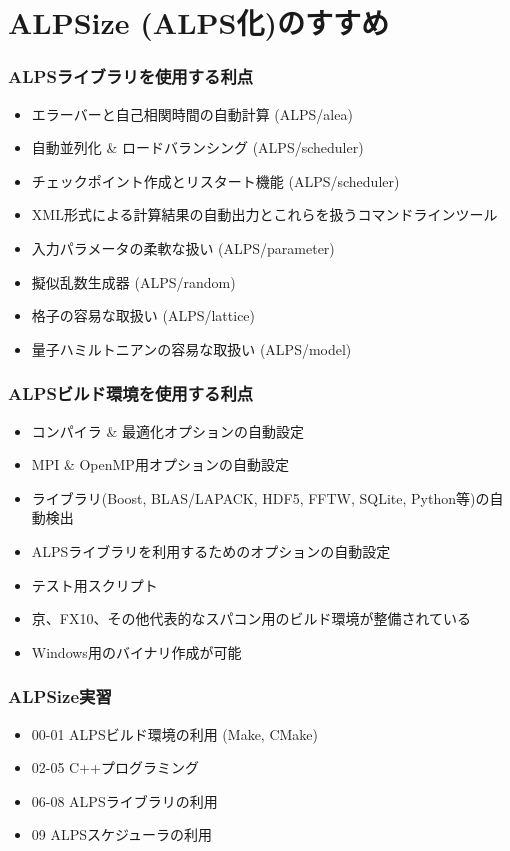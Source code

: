 \section{ALPSize (ALPS化)のすすめ}
\begin{frame}
  \frametitle{ALPSライブラリを使用する利点}
  \begin{itemize}
  \item エラーバーと自己相関時間の自動計算 (ALPS/alea)
  \item 自動並列化 \& ロードバランシング (ALPS/scheduler)
  \item チェックポイント作成とリスタート機能 (ALPS/scheduler)
  \item XML形式による計算結果の自動出力とこれらを扱うコマンドラインツール
  \item 入力パラメータの柔軟な扱い (ALPS/parameter)
  \item 擬似乱数生成器 (ALPS/random)
  \item 格子の容易な取扱い (ALPS/lattice)
  \item 量子ハミルトニアンの容易な取扱い (ALPS/model)
  \end{itemize}
\end{frame}

\begin{frame}
  \frametitle{ALPSビルド環境を使用する利点}
  \begin{itemize}
  \item コンパイラ \& 最適化オプションの自動設定
  \item MPI \& OpenMP用オプションの自動設定
  \item ライブラリ(Boost, BLAS/LAPACK, HDF5, FFTW, SQLite, Python等)の自動検出
  \item ALPSライブラリを利用するためのオプションの自動設定
  \item テスト用スクリプト
  \item 京、FX10、その他代表的なスパコン用のビルド環境が整備されている
  \item Windows用のバイナリ作成が可能
  \end{itemize}
\end{frame}

\begin{frame}
  \frametitle{ALPSize実習}
  \begin{itemize}
    \setlength{\itemsep}{1em}
  \item 00-01 ALPSビルド環境の利用 (Make, CMake)
  \item 02-05 C++プログラミング
  \item 06-08 ALPSライブラリの利用
  \item 09 ALPSスケジューラの利用
  \end{itemize}
\end{frame}

